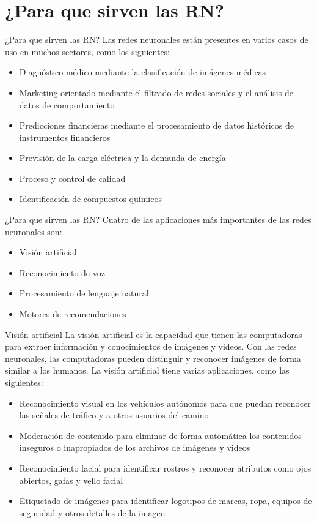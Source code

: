 \documentclass[11pt,aspectratio=169]{beamer}
\begin{document}
\section{¿Para que sirven las RN?}
\begin{frame}{¿Para que sirven las RN?}
	Las redes neuronales están presentes en varios casos de uso en muchos sectores, como los siguientes:\pause
	\begin{itemize}
		\item Diagnóstico médico mediante la clasificación de imágenes médicas \pause
		\item Marketing orientado mediante el filtrado de redes sociales y el análisis de datos de comportamiento\pause
		\item Predicciones financieras mediante el procesamiento de datos históricos de instrumentos financieros\pause
		\item Previsión de la carga eléctrica y la demanda de energía\pause 
		\item Proceso y control de calidad\pause 
		\item Identificación de compuestos químicos
	\end{itemize}
\end{frame}

\begin{frame}{¿Para que sirven las RN?}
	Cuatro de las aplicaciones más importantes de las redes neuronales son: \pause
	\begin{itemize}
		\item Visión artificial \pause
		\item Reconocimiento de voz\pause
		\item Procesamiento de lenguaje natural\pause
		\item Motores de recomendaciones
	\end{itemize}
\end{frame}

\begin{frame}{Visión artificial}
	La visión artificial es la capacidad que tienen las computadoras para extraer información y conocimientos de imágenes y videos.\pause 
	Con las redes neuronales, las computadoras pueden distinguir y reconocer imágenes de forma similar a los humanos.\pause
	La visión artificial tiene varias aplicaciones, como las siguientes:\pause
	\begin{itemize}
		\item Reconocimiento visual en los vehículos autónomos para que puedan reconocer las señales de tráfico y a otros usuarios del camino \pause
		\item Moderación de contenido para eliminar de forma automática los contenidos inseguros o inapropiados de los archivos de imágenes y videos\pause
		\item Reconocimiento facial para identificar rostros y reconocer atributos como ojos abiertos, gafas y vello facial\pause
		\item Etiquetado de imágenes para identificar logotipos de marcas, ropa, equipos de seguridad y otros detalles de la imagen
	\end{itemize}
\end{frame}
\end{document}
